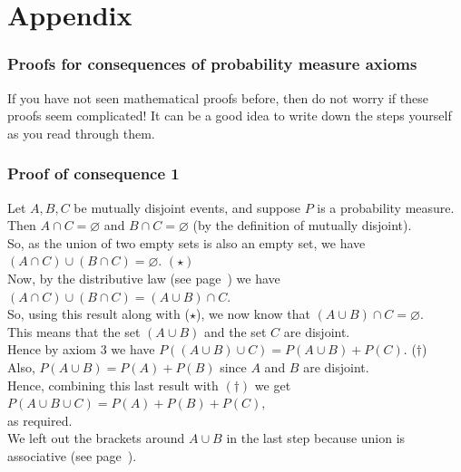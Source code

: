 \section{Appendix} \label{appendix A}

	\subsubsection*{Proofs for consequences of probability measure axioms}
	If you have not seen mathematical proofs before, then do not worry if these proofs seem complicated! It can be a 	        good idea to write down the steps yourself as you read through them.
	\subsubsection*{Proof of consequence 1}
	Let $A,B,C$ be mutually disjoint events, and suppose $P$ is a probability measure. \\
	
	 Then $A \cap C = \varnothing$ and $B \cap C = \varnothing$ (by the definition of mutually disjoint). \\
	
	\noindent So, as the union of two empty sets is also an empty set, we have $(A \cap C) \cup (B \cap C) = 	    	 
	\varnothing$. $(\star)$ \\
	
	\noindent Now, by the distributive law (see page~\pageref{distributive law}) we have $(A \cap C) \cup (B \cap C) = 
	(A \cup B) \cap C.$ \\ So, using this result along with ($\star$), we now know that $(A \cup B) \cap C = \varnothing$.  \\
	
	\noindent This means that the set $(A \cup B)$ and the set $C$ are disjoint. \\
	
	\noindent Hence by axiom 3 we have $P((A \cup B) \cup C) = P(A \cup B) + P(C).$ \;\;\; ($\dagger$) \\
	
	\noindent Also, $P(A \cup B) = P(A) + P(B)$ since $A$ and $B$ are disjoint. \\
	
	\noindent Hence, combining this last result with $(\dagger)$ we get $P(A \cup B \cup C) = P(A) + P(B) + P(C),$ \\ as 
	required. \\ 
	
	\noindent We left out the brackets around $A \cup B$ in the last step because union is associative (see 
	page~\pageref{distributive law}). \\
	
